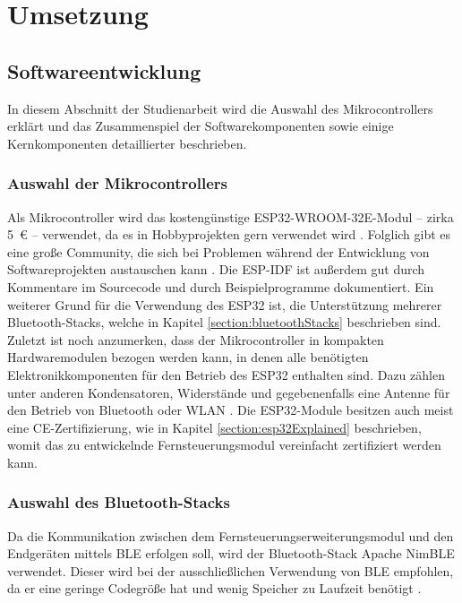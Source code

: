 
\chapter{Umsetzung}

\section{Softwareentwicklung}
In diesem Abschnitt der Studienarbeit wird die Auswahl des Mikrocontrollers erklärt und das Zusammenspiel der Softwarekomponenten sowie einige Kernkomponenten detaillierter beschrieben.

\subsection{Auswahl der Mikrocontrollers}
Als Mikrocontroller wird das kostengünstige ESP32-WROOM-32E-Modul -- zirka 5~€ \cite{espressifModules} -- verwendet, da es in Hobbyprojekten gern verwendet wird \cites{redditESP32}{esp32Forum}. Folglich gibt es eine große Community, die sich bei Problemen während der Entwicklung von Softwareprojekten austauschen kann \cites{redditESP32}{esp32Forum}. Die \ac{ESP-IDF} ist außerdem gut durch Kommentare im Sourcecode und durch Beispielprogramme dokumentiert. Ein weiterer Grund für die Verwendung des ESP32 ist, die Unterstützung mehrerer Bluetooth-Stacks, welche in Kapitel \ref{section:bluetoothStacks} beschrieben sind. Zuletzt ist noch anzumerken, dass der Mikrocontroller in kompakten Hardwaremodulen bezogen werden kann, in denen alle benötigten Elektronikkomponenten für den Betrieb des ESP32 enthalten sind. Dazu zählen unter anderen Kondensatoren, Widerstände und gegebenenfalls eine Antenne für den Betrieb von Bluetooth oder \acs{WLAN} \cite[S.~14]{espressifHardwareDesignGuidelines}. Die ESP32-Module besitzen auch meist eine CE-Zertifizierung, wie in Kapitel \ref{section:esp32Explained} beschrieben, womit das zu entwickelnde Fernsteuerungsmodul vereinfacht zertifiziert werden kann.

\subsection{Auswahl des Bluetooth-Stacks}
\label{section:bluetoothStackSelection}
Da die Kommunikation zwischen dem Fernsteuerungserweiterungsmodul und den Endgeräten mittels \ac{BLE} erfolgen soll, wird der Bluetooth-Stack Apache NimBLE verwendet. Dieser wird bei der ausschließlichen Verwendung von \ac{BLE} empfohlen, da er eine geringe Codegröße hat und wenig Speicher zu Laufzeit benötigt \cite{espidfBluetoothStack}.

